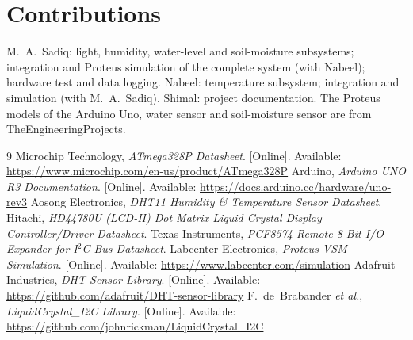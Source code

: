 \documentclass[10pt,twocolumn,a4paper]{article}
\begin{document}
\section*{Contributions}
\small M.~A.~Sadiq: light, humidity, water-level and soil-moisture subsystems; integration and Proteus simulation of the complete system (with Nabeel); hardware test and data logging. Nabeel: temperature subsystem; integration and simulation (with M.~A.~Sadiq). Shimal: project documentation. The Proteus models of the Arduino Uno, water sensor and soil-moisture sensor are from TheEngineeringProjects.

\begin{thebibliography}{9}\small\setlength\itemsep{1pt}
 Microchip Technology, \emph{ATmega328P Datasheet}. [Online]. Available: \url{https://www.microchip.com/en-us/product/ATmega328P}
 Arduino, \emph{Arduino UNO R3 Documentation}. [Online]. Available: \url{https://docs.arduino.cc/hardware/uno-rev3}
 Aosong Electronics, \emph{DHT11 Humidity \& Temperature Sensor Datasheet}.
 Hitachi, \emph{HD44780U (LCD-II) Dot Matrix Liquid Crystal Display Controller/Driver Datasheet}.
 Texas Instruments, \emph{PCF8574 Remote 8-Bit I/O Expander for I$^2$C Bus Datasheet}.
 Labcenter Electronics, \emph{Proteus VSM Simulation}. [Online]. Available: \url{https://www.labcenter.com/simulation}
 Adafruit Industries, \emph{DHT Sensor Library}. [Online]. Available: \url{https://github.com/adafruit/DHT-sensor-library}
 F.~de~Brabander \emph{et al.}, \emph{LiquidCrystal\_I2C Library}. [Online]. Available: \url{https://github.com/johnrickman/LiquidCrystal_I2C}
\end{thebibliography}
\end{document}
